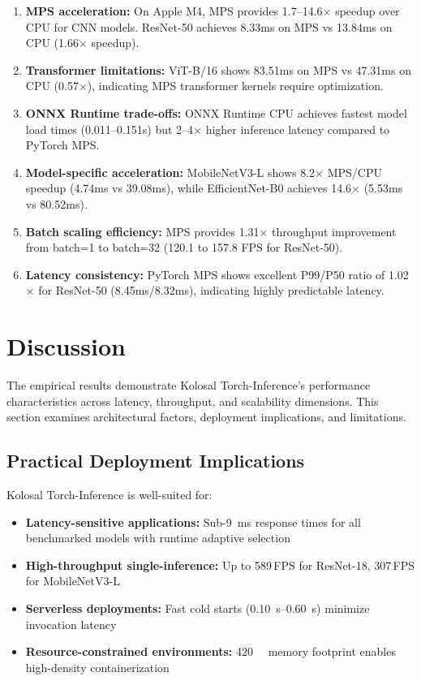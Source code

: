 \documentclass[10pt,twocolumn,a4paper]{article}
\theoremstyle{definition}
\theoremstyle{plain}
\newcommand{\fpssuffix}{\,FPS}
\begin{document}
\begin{enumerate}
    \item \textbf{MPS acceleration:} On Apple M4, MPS provides 1.7--14.6$\times$ speedup over CPU for CNN models. ResNet-50 achieves 8.33ms on MPS vs 13.84ms on CPU (1.66$\times$ speedup).
    
    \item \textbf{Transformer limitations:} ViT-B/16 shows 83.51ms on MPS vs 47.31ms on CPU (0.57$\times$), indicating MPS transformer kernels require optimization.
    
    \item \textbf{ONNX Runtime trade-offs:} ONNX Runtime CPU achieves fastest model load times (0.011--0.151s) but 2--4$\times$ higher inference latency compared to PyTorch MPS.
    
    \item \textbf{Model-specific acceleration:} MobileNetV3-L shows 8.2$\times$ MPS/CPU speedup (4.74ms vs 39.08ms), while EfficientNet-B0 achieves 14.6$\times$ (5.53ms vs 80.52ms).
    
    \item \textbf{Batch scaling efficiency:} MPS provides 1.31$\times$ throughput improvement from batch=1 to batch=32 (120.1 to 157.8 FPS for ResNet-50).
    
    \item \textbf{Latency consistency:} PyTorch MPS shows excellent P99/P50 ratio of 1.02$\times$ for ResNet-50 (8.45ms/8.32ms), indicating highly predictable latency.
\end{enumerate}

\section{Discussion}
\label{sec:discussion}

The empirical results demonstrate Kolosal Torch-Inference's performance characteristics across latency, throughput, and scalability dimensions. This section examines architectural factors, deployment implications, and limitations.

\subsection{Practical Deployment Implications}

Kolosal Torch-Inference is well-suited for:
\begin{itemize}
    \item \textbf{Latency-sensitive applications:} Sub-\SI{9}{\milli\second} response times for all benchmarked models with runtime adaptive selection
    \item \textbf{High-throughput single-inference:} Up to \num{589}\fpssuffix{} for ResNet-18, \num{307}\fpssuffix{} for MobileNetV3-L
    \item \textbf{Serverless deployments:} Fast cold starts (\SIrange{0.10}{0.60}{\second}) minimize invocation latency
    \item \textbf{Resource-constrained environments:} \SI{420}{\mega\byte} memory footprint enables high-density containerization
\end{itemize}
\end{document}
